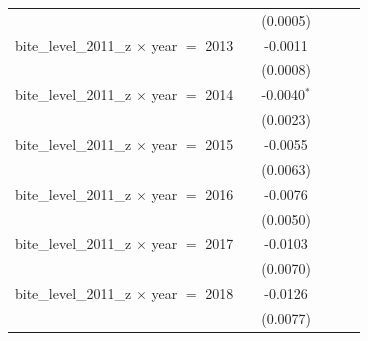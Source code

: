 \begin{tabular}{lccccc}
                                                                &                    & (0.0005)        &                       &                            &   \\   
   bite\_level\_2011\_z $\times$ year $=$ 2013                  &                    & -0.0011         &                       &                            &   \\   
                                                                &                    & (0.0008)        &                       &                            &   \\   
   bite\_level\_2011\_z $\times$ year $=$ 2014                  &                    & -0.0040$^{*}$   &                       &                            &   \\   
                                                                &                    & (0.0023)        &                       &                            &   \\   
   bite\_level\_2011\_z $\times$ year $=$ 2015                  &                    & -0.0055         &                       &                            &   \\   
                                                                &                    & (0.0063)        &                       &                            &   \\   
   bite\_level\_2011\_z $\times$ year $=$ 2016                  &                    & -0.0076         &                       &                            &   \\   
                                                                &                    & (0.0050)        &                       &                            &   \\   
   bite\_level\_2011\_z $\times$ year $=$ 2017                  &                    & -0.0103         &                       &                            &   \\   
                                                                &                    & (0.0070)        &                       &                            &   \\   
   bite\_level\_2011\_z $\times$ year $=$ 2018                  &                    & -0.0126         &                       &                            &   \\   
                                                                &                    & (0.0077)        &                       &                            &   \\   

\end{tabular}
